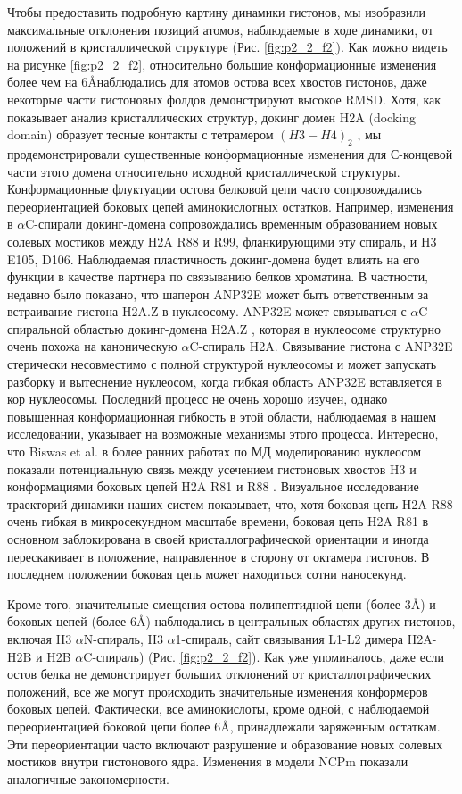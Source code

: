     Чтобы предоставить подробную картину динамики гистонов, мы изобразили максимальные отклонения позиций атомов, наблюдаемые в ходе динамики, от положений в кристаллической структуре (Рис. \ref{fig:p2_2_f2}). Как можно видеть на рисунке \ref{fig:p2_2_f2}, относительно большие конформационные изменения более чем на 6\AA наблюдались для атомов остова всех хвостов гистонов, даже некоторые части гистоновых фолдов демонстрируют высокое RMSD. Хотя, как показывает анализ кристаллических структур, докинг домен H2A (docking domain) образует тесные контакты с тетрамером $(H3-H4)_2$ \cite{suto_crystal_2000}, мы продемонстрировали существенные конформационные изменения для С-концевой части этого домена относительно исходной кристаллической структуры. Конформационные флуктуации остова белковой цепи часто сопровождались переориентацией боковых цепей аминокислотных остатков. Например, изменения в $\alpha$C-спирали докинг-домена сопровождались временным образованием новых солевых мостиков между H2A R88 и R99, фланкирующими эту спираль, и H3 E105, D106. Наблюдаемая пластичность докинг-домена будет влиять на его функции в качестве партнера по связыванию белков хроматина. В частности, недавно было показано, что шаперон ANP32E может быть ответственным за встраивание гистона H2A.Z в нуклеосому. ANP32E может связываться с $\alpha$C-спиральной областью докинг-домена H2A.Z \cite{obri_anp32e_2014}, которая в нуклеосоме структурно очень похожа на каноническую $\alpha$C-спираль H2A. Связывание гистона с ANP32E стерически несовместимо с полной структурой нуклеосомы и может запускать разборку и вытеснение нуклеосом, когда гибкая область ANP32E вставляется в кор нуклеосомы. Последний процесс не очень хорошо изучен, однако повышенная конформационная гибкость в этой области, наблюдаемая в нашем исследовании, указывает на возможные механизмы этого процесса. Интересно, что Biswas et al. в более ранних работах по МД моделированию нуклеосом показали потенциальную связь между усечением гистоновых хвостов H3 и конформациями боковых цепей H2A R81 и R88 \cite{biswas_role_2011}. Визуальное исследование траекторий динамики наших систем показывает, что, хотя боковая цепь H2A R88 очень гибкая в микросекундном масштабе времени, боковая цепь H2A R81 в основном заблокирована в своей кристаллографической ориентации и иногда перескакивает в положение, направленное в сторону от октамера гистонов. В последнем положении боковая цепь может находиться сотни наносекунд.

    Кроме того, значительные смещения остова полипептидной цепи (более 3\AA) и боковых цепей (более 6\AA) наблюдались в центральных областях других гистонов, включая H3 $\alpha$N-спираль, H3 $\alpha$1-спираль, сайт связывания L1-L2 димера H2A-H2B и H2B $\alpha$C-спираль) (Рис. \ref{fig:p2_2_f2}). Как уже упоминалось, даже если остов белка не демонстрирует больших отклонений от кристаллографических положений, все же могут происходить значительные изменения конформеров боковых цепей. Фактически, все аминокислоты, кроме одной, с наблюдаемой переориентацией боковой цепи более 6\AA, принадлежали заряженным остаткам. Эти переориентации часто включают разрушение и образование новых солевых мостиков внутри гистонового ядра. Изменения в модели NCPm показали аналогичные закономерности.


